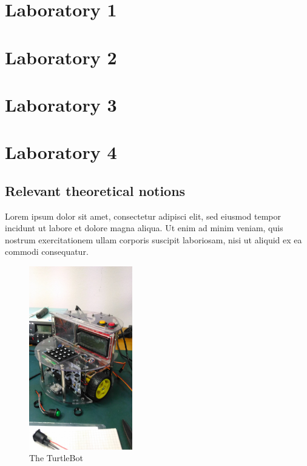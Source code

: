 \documentclass[english]{article}
\begin{document}
\tableofcontents
\newpage

\section{Laboratory 1}


\section{Laboratory 2}


\section{Laboratory 3}


\section{Laboratory 4}



\subsection{Relevant theoretical notions}

Lorem ipsum dolor sit amet, consectetur adipisci elit, sed eiusmod tempor incidunt ut labore et dolore magna aliqua. Ut enim ad minim veniam, quis nostrum exercitationem ullam corporis suscipit laboriosam, nisi ut aliquid ex ea commodi consequatur.

\begin{figure}[!h]
	\centering
	\includegraphics[width=0.4\textwidth]{figures/turtlebot_1.jpg}
	\caption{The TurtleBot}
	\label{fig:turtlebot}
\end{figure}
\end{document}
